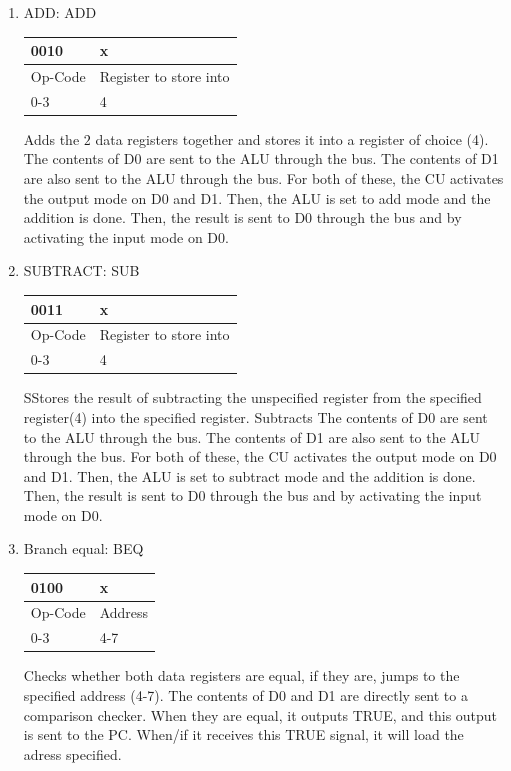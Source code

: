 \documentclass{mcgillhomework}
\begin{document}
\begin{enumerate}
		\item ADD: ADD\\
		\begin{tabularx}{\textwidth}{|X|X|}
			\hline 0010 & x
			\\ \hline Op-Code & Register to store into
			\\ \hline 0-3 & 4
			\\ \hline
		\end{tabularx}
		Adds the $2$ data registers together and stores it into a register of choice (4). The contents of D0 are sent to the ALU through the bus. The contents of D1 are also sent to the ALU through the bus. For both of these, the CU activates the output mode on D0 and D1. Then, the ALU is set to add mode and the addition is done. Then, the result is sent to D0 through the bus and by activating the input mode on D0.
		
		\item SUBTRACT: SUB\\
		\begin{tabularx}{\textwidth}{|X|X|}
			\hline 0011 & x
			\\ \hline Op-Code & Register to store into
			\\ \hline 0-3 & 4
			\\ \hline
		\end{tabularx}
		SStores the result of subtracting the unspecified register from the specified register(4) into the specified register. Subtracts The contents of D0 are sent to the ALU through the bus. The contents of D1 are also sent to the ALU through the bus. For both of these, the CU activates the output mode on D0 and D1. Then, the ALU is set to subtract mode and the addition is done. Then, the result is sent to D0 through the bus and by activating the input mode on D0.  
		
		\item Branch equal: BEQ\\
		\begin{tabularx}{\textwidth}{|X|X|}
			\hline 0100 & x
			\\ \hline Op-Code & Address
			\\ \hline 0-3 & 4-7
			\\ \hline
		\end{tabularx}
		Checks whether both data registers are equal, if they are, jumps to the specified address (4-7). The contents of D0 and D1 are directly sent to a comparison checker. When they are equal, it outputs TRUE, and this output is sent to the PC. When/if it receives this TRUE signal, it will load the adress specified.
		

\end{enumerate}
\end{document}
